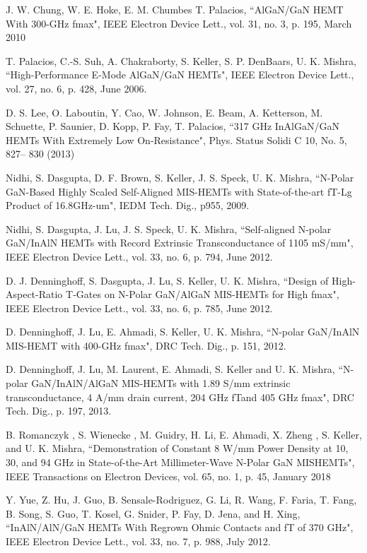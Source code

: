 \documentclass[journal]{IEEEtran}
\begin{document}
\begin{thebibliography}{00}
 J. W. Chung, W. E. Hoke, E. M. Chumbes T. Palacios, ``AlGaN/GaN HEMT With 300-GHz fmax",  IEEE Electron Device Lett., vol. 31, no. 3, p. 195, March 2010

 T. Palacios, C.-S. Suh, A. Chakraborty, S. Keller, S. P. DenBaars, U. K. Mishra, ``High-Performance E-Mode AlGaN/GaN HEMTs", IEEE Electron Device Lett., vol. 27, no. 6, p. 428, June 2006.

 D. S. Lee, O. Laboutin, Y. Cao, W. Johnson, E. Beam, A. Ketterson, M. Schuette, P. Saunier, D. Kopp, P. Fay, T. Palacios, ``317 GHz InAlGaN/GaN HEMTs With Extremely Low On-Resistance", Phys. Status Solidi C 10, No. 5, 827– 830 (2013)

 Nidhi, S. Dasgupta, D. F. Brown, S. Keller, J. S. Speck, U. K. Mishra, ``N-Polar GaN-Based Highly Scaled Self-Aligned MIS-HEMTs with State-of-the-art fT-Lg Product of 16.8GHz-um", IEDM Tech. Dig., p955, 2009.

 Nidhi, S. Dasgupta, J. Lu, J. S. Speck, U. K. Mishra, ``Self-aligned N-polar GaN/InAlN HEMTs with Record Extrinsic Transconductance of 1105 mS/mm",  IEEE Electron Device Lett., vol. 33, no. 6, p. 794, June 2012.

 D. J. Denninghoff, S. Dasgupta, J. Lu, S. Keller, U. K. Mishra, ``Design of High-Aspect-Ratio T-Gates on N-Polar GaN/AlGaN MIS-HEMTs for High fmax",  IEEE Electron Device Lett., vol. 33, no. 6, p. 785, June 2012.

 D. Denninghoff, J. Lu, E. Ahmadi, S. Keller, U. K. Mishra, ``N-polar GaN/InAlN MIS-HEMT with 400-GHz fmax", DRC Tech. Dig., p. 151, 2012.

 D. Denninghoff, J. Lu, M. Laurent, E. Ahmadi, S. Keller and U. K. Mishra, ``N-polar GaN/InAlN/AlGaN MIS-HEMTs with 1.89 S/mm extrinsic transconductance, 4 A/mm drain current, 204 GHz fTand 405 GHz fmax", DRC Tech. Dig., p. 197, 2013.

 B. Romanczyk , S. Wienecke , M. Guidry, H. Li, E. Ahmadi, X. Zheng , S. Keller, and U. K. Mishra, ``Demonstration of Constant 8 W/mm Power Density at 10, 30, and 94 GHz in State-of-the-Art Millimeter-Wave N-Polar GaN MISHEMTs", IEEE Transactions on Electron Devices, vol. 65, no. 1, p. 45,  January 2018

 Y. Yue, Z. Hu, J. Guo, B. Sensale-Rodriguez, G. Li, R. Wang, F. Faria, T. Fang, B. Song, S. Guo, T. Kosel, G. Snider, P. Fay, D. Jena, and H. Xing, ``InAlN/AlN/GaN HEMTs With Regrown Ohmic Contacts and fT of 370 GHz", IEEE Electron Device Lett., vol. 33, no. 7, p. 988, July 2012.


\end{thebibliography}
\end{document}
